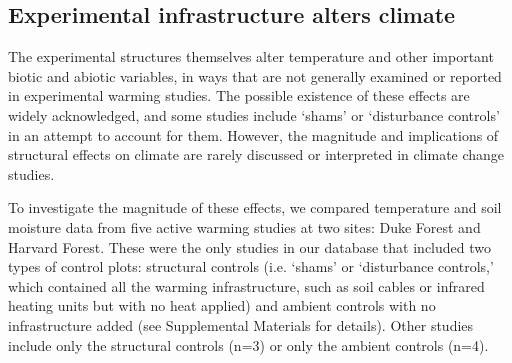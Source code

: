 \documentclass{article}
\begin{document}
\subsection* {Experimental infrastructure alters climate}
The experimental structures themselves alter temperature and other important biotic and abiotic variables, in ways that are not generally examined or reported in experimental warming studies. The possible existence of these effects are widely acknowledged, and some studies include `shams' or `disturbance controls' in an attempt to account for them. However, the magnitude and implications of structural effects on climate are rarely discussed or interpreted in climate change studies.
\par To investigate the magnitude of these effects, we compared temperature and soil moisture data from five active warming studies at two sites: Duke Forest and Harvard Forest\citep{farnsworth1995,clark2014a, marchin2014, pelini2011}. These were the only studies in our database that included two types of control plots: structural controls (i.e. `shams' or `disturbance controls,' which contained all the warming infrastructure, such as soil cables or infrared heating units but with no heat applied) and ambient controls with no infrastructure added (see Supplemental Materials for details). Other studies include only the structural controls (n=3) or only the ambient controls (n=4).
\end{document}
